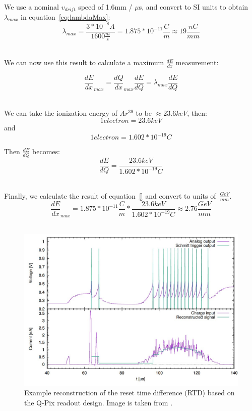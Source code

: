 We use a nominal $v_{drift}$ speed of 1.6mm / $\mu$s, and convert to SI units to obtain $\lambda_{max}$ in equation~\ref{eq:lambdaMax}:
\begin{equation}
\lambda_{max} = \frac{3*10^{-8} A}{1600 \frac{m}{s}} = 1.875*10^{-11} \frac{C}{m} \approx 19 \frac{nC}{mm}
\end{equation}
~\label{eq:lambdaCalc}

We can now use this result to calculate a maximum $\frac{dE}{dx}$ measurement:

\begin{equation}
\frac{dE}{dx}_{max} = \frac{dQ}{dx}_{max}\frac{dE}{dQ} = \lambda_{max}\frac{dE}{dQ}
\end{equation}
~\label{eq:dedxMax}

We can take the ionization energy of $Ar^{39}$ to be $\approx 23.6 keV$, then:
$$
1 electron = 23.6 keV
$$
and
$$
1 electron = 1.602*10^{-19} C
$$

Then $\frac{dE}{dQ}$ becomes:
\begin{equation}
\frac{dE}{dQ} = \frac{23.6 keV}{1.602*10^{-19} C}
\end{equation}
~\label{eq:dedxValue}

Finally, we calculate the result of equation~\ref{} and convert to units of~$\frac{GeV}{mm}$.
\begin{equation}
\frac{dE}{dx}_{max} = 1.875*10^{-11} \frac{C}{m} * \frac{23.6 keV}{1.602*10^{-19} C} \approx 2.76 \frac{GeV}{mm}
\end{equation}
~\label{eq:dedxCalc}


\begin{figure}[]
\centering
\includegraphics[width=\textwidth]{images/qpix_rtd_reconstruction_example.jpg}
\caption{Example reconstruction of the reset time difference (RTD) based on the Q-Pix readout design. Image is taken from \citep{qpix:nygren:mei}.}
\end{figure}
~\label{fig:qpixRecon1}

